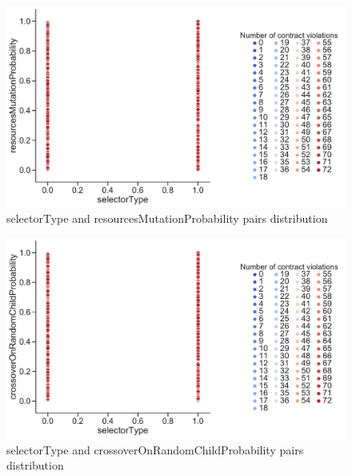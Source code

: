 \begin{figure}
	\centering
	\includegraphics[width=\textwidth]{images/PairsDistr/selectorType_resourcesMutationProbability.pdf}
	\caption[selectorType and resourcesMutationProbability pairs distribution]{selectorType and resourcesMutationProbability pairs distribution}
	\label{fig:selectorType_resourcesMutationProbability_pair}
\end{figure}
\begin{figure}
	\centering
	\includegraphics[width=\textwidth]{images/PairsDistr/selectorType_crossoverOnRandomChildProbability.pdf}
	\caption[selectorType and crossoverOnRandomChildProbability pairs distribution]{selectorType and crossoverOnRandomChildProbability pairs distribution}
	\label{fig:selectorType_crossoverOnRandomChildProbability_pair}
\end{figure}
